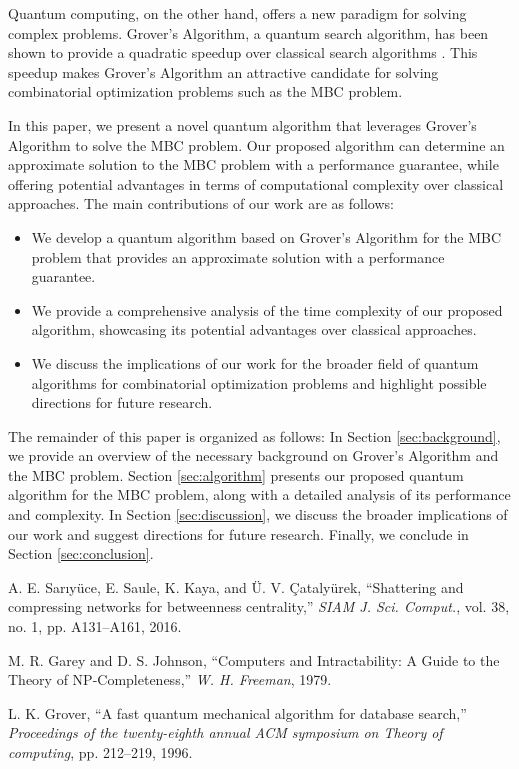 Quantum computing, on the other hand, offers a new paradigm for solving complex problems. Grover's Algorithm, a quantum search algorithm, has been shown to provide a quadratic speedup over classical search algorithms \cite{grover}. This speedup makes Grover's Algorithm an attractive candidate for solving combinatorial optimization problems such as the MBC problem.

In this paper, we present a novel quantum algorithm that leverages Grover's Algorithm to solve the MBC problem. Our proposed algorithm can determine an approximate solution to the MBC problem with a performance guarantee, while offering potential advantages in terms of computational complexity over classical approaches. The main contributions of our work are as follows:

\begin{itemize}
    \item We develop a quantum algorithm based on Grover's Algorithm for the MBC problem that provides an approximate solution with a performance guarantee.
    
    \item We provide a comprehensive analysis of the time complexity of our proposed algorithm, showcasing its potential advantages over classical approaches.
    
    \item We discuss the implications of our work for the broader field of quantum algorithms for combinatorial optimization problems and highlight possible directions for future research.
\end{itemize}

The remainder of this paper is organized as follows: In Section \ref{sec:background}, we provide an overview of the necessary background on Grover's Algorithm and the MBC problem. Section \ref{sec:algorithm} presents our proposed quantum algorithm for the MBC problem, along with a detailed analysis of its performance and complexity. In Section \ref{sec:discussion}, we discuss the broader implications of our work and suggest directions for future research. Finally, we conclude in Section \ref{sec:conclusion}.

\begin{thebibliography}{9}
  A. E. Sar\i yüce, E. Saule, K. Kaya, and Ü. V. Çatalyürek, ``Shattering and compressing networks for betweenness centrality,'' \emph{SIAM J. Sci. Comput.}, vol. 38, no. 1, pp. A131--A161, 2016.

  M. R. Garey and D. S. Johnson, ``Computers and Intractability: A Guide to the Theory of NP-Completeness,'' \emph{W. H. Freeman}, 1979.

  L. K. Grover, ``A fast quantum mechanical algorithm for database search,'' \emph{Proceedings of the twenty-eighth annual ACM symposium on Theory of computing}, pp. 212--219, 1996.
\end{thebibliography}

